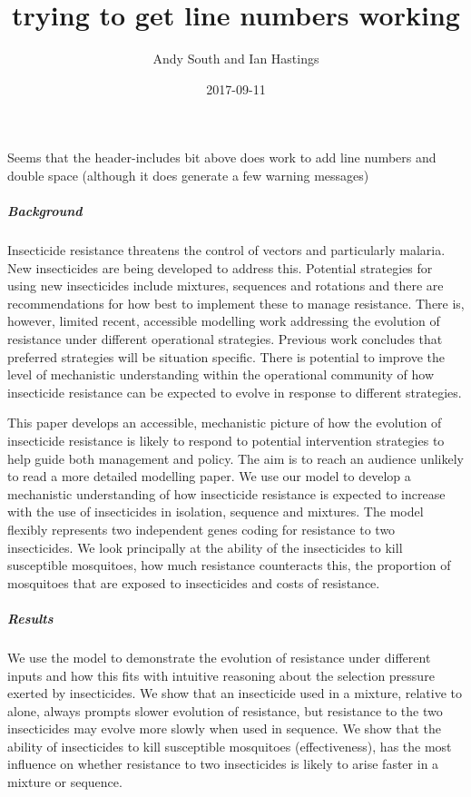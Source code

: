 \documentclass[11pt,]{article}
\title{trying to get line numbers working}
\author{Andy South and Ian Hastings}
\date{2017-09-11}
\let\oldsubparagraph\subparagraph
\renewcommand{\subparagraph}[1]{\oldsubparagraph{#1}\mbox{}}
\begin{document}
\maketitle

Seems that the header-includes bit above does work to add line numbers
and double space (although it does generate a few warning messages)

\subparagraph{Background}\label{background}

Insecticide resistance threatens the control of vectors and particularly
malaria. New insecticides are being developed to address this. Potential
strategies for using new insecticides include mixtures, sequences and
rotations and there are recommendations for how best to implement these
to manage resistance. There is, however, limited recent, accessible
modelling work addressing the evolution of resistance under different
operational strategies. Previous work concludes that preferred
strategies will be situation specific. There is potential to improve the
level of mechanistic understanding within the operational community of
how insecticide resistance can be expected to evolve in response to
different strategies.

This paper develops an accessible, mechanistic picture of how the
evolution of insecticide resistance is likely to respond to potential
intervention strategies to help guide both management and policy. The
aim is to reach an audience unlikely to read a more detailed modelling
paper. We use our model to develop a mechanistic understanding of how
insecticide resistance is expected to increase with the use of
insecticides in isolation, sequence and mixtures. The model flexibly
represents two independent genes coding for resistance to two
insecticides. We look principally at the ability of the insecticides to
kill susceptible mosquitoes, how much resistance counteracts this, the
proportion of mosquitoes that are exposed to insecticides and costs of
resistance.

\subparagraph{Results}\label{results}

We use the model to demonstrate the evolution of resistance under
different inputs and how this fits with intuitive reasoning about the
selection pressure exerted by insecticides. We show that an insecticide
used in a mixture, relative to alone, always prompts slower evolution of
resistance, but resistance to the two insecticides may evolve more
slowly when used in sequence. We show that the ability of insecticides
to kill susceptible mosquitoes (effectiveness), has the most influence
on whether resistance to two insecticides is likely to arise faster in a
mixture or sequence.
\end{document}
